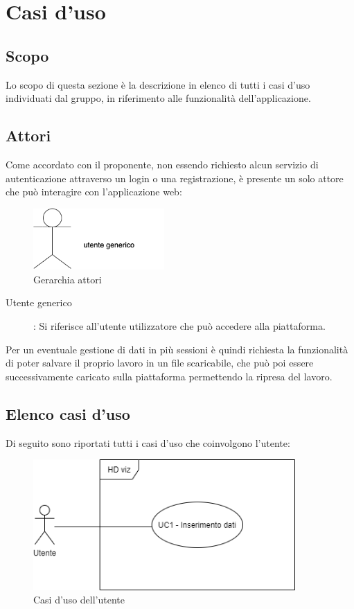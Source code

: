 \section{Casi d'uso}
\subsection{Scopo}
Lo scopo di questa sezione è la descrizione in elenco di tutti i casi d'uso individuati dal gruppo, in riferimento alle funzionalità dell'applicazione.
\subsection{Attori}
Come accordato con il proponente, non essendo richiesto alcun servizio di autenticazione attraverso un login o una registrazione, è presente un solo attore che può interagire con l'applicazione web:

\begin{figure}[h]
\includegraphics[width=5cm]{section/images/utente.png}
\centering
\caption{Gerarchia attori}
\end{figure}

\begin{description}
\item[Utente generico]:
Si riferisce all'utente utilizzatore che può accedere alla piattaforma.
\end{description}
Per un eventuale gestione di dati in più sessioni è quindi richiesta la funzionalità di poter salvare il proprio lavoro in un file scaricabile, che può poi essere successivamente caricato sulla piattaforma permettendo la ripresa del lavoro.
\subsection{Elenco casi d'uso}
Di seguito sono riportati tutti i casi d'uso che coinvolgono l'utente:
\begin{figure}[h]
\includegraphics[width=10cm]{section/images/HDviz.png}
\centering
\caption{Casi d'uso dell'utente}
\end{figure}

